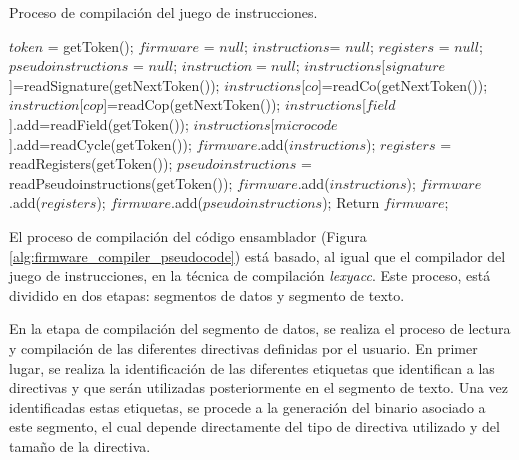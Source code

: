 \clearpage

\begin{algorithm}[h]
	\caption{Proceso de compilación del juego de instrucciones.}
	\label{alg:firmware_compiler_pseudocode}
  	\scriptsize
	\begin{algorithmic}[1]
		\State $token$ = getToken();
		\State $firmware$ = $null$;
		\State $instructions $= $null$;
		\State $registers$ = $null$;
		\State $pseudoinstructions$ = $null$;
			\State $instruction = null$;
			\State $instructions$[$signature$]=readSignature(getNextToken());
			\State $instructions$[$co$]=readCo(getNextToken());
				\State $instruction$[$cop$]=readCop(getNextToken());
			\EndIf
				\State $instructions$[$field$].add=readField(getToken());
			\EndWhile
				\State $instructions$[$microcode$].add=readCycle(getToken());
			\EndWhile
			\State $firmware$.add($instructions$);
		\EndWhile
			\State $registers$ = readRegisters(getToken());
		\EndIf
			\State $pseudoinstructions$ = readPseudoinstructions(getToken());
		\EndIf
		\State $firmware$.add($instructions$);
		\State $firmware$.add($registers$);
		\State $firmware$.add($pseudoinstructions$);
		\State Return $firmware$;
		\EndFunction
	\end{algorithmic}
\end{algorithm}

\clearpage

El proceso de compilación del código ensamblador (Figura \ref{alg:firmware_compiler_pseudocode}) está basado, al igual que el compilador del juego de instrucciones, en la técnica de compilación \textit{\gls{lexyacc}}. Este proceso, está dividido en dos etapas: segmentos de datos y segmento de texto.

En la etapa de compilación del segmento de datos, se realiza el proceso de lectura y compilación de las diferentes directivas definidas por el usuario. En primer lugar, se realiza la identificación de las diferentes etiquetas que identifican a las directivas y que serán utilizadas posteriormente en el segmento de texto. Una vez identificadas estas etiquetas, se procede a la generación del binario asociado a este segmento, el cual depende directamente del tipo de directiva utilizado y del tamaño de la directiva.


